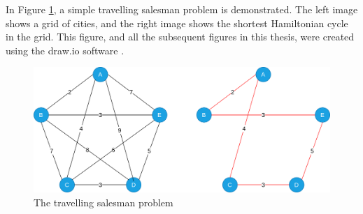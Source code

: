In Figure \ref{fig:tsp}, a simple travelling salesman problem is demonstrated. The left image shows a grid of cities, and the right image shows the shortest Hamiltonian cycle in the grid. This figure, and all the subsequent figures in this thesis, were created using the draw.io software \citep{drawio}.

\begin{figure}[!htbp]
	\centering
	\includegraphics[scale=0.25]{../images/TSP.png}
	\caption{The travelling salesman problem}
    \label{fig:tsp}
\end{figure}